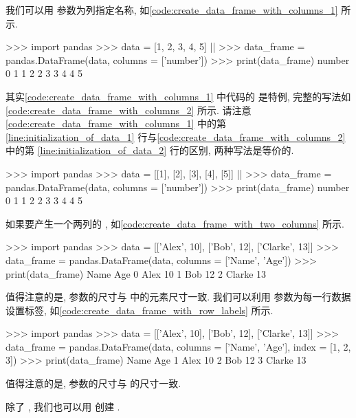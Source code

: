 我们可以用  参数为列指定名称, 如\cref{code:create_data_frame_with_columns_1} 所示.%
%
\begin{codebox}[
  label = code:create_data_frame_with_columns_1,
  caption = 用 \inlinetext{columns} 参数为列指定名称
]
>>> import pandas
>>> data = [1, 2, 3, 4, 5] |\label{line:initialization_of_data_1}|
>>> data_frame = pandas.DataFrame(data, columns = ['number'])
>>> print(data_frame)
   number
0       1
1       2
2       3
3       4
4       5
\end{codebox}%
%
其实\cref{code:create_data_frame_with_columns_1} 中代码的  是特例, 完整的写法如\cref{code:create_data_frame_with_columns_2} 所示. 请注意\cref{code:create_data_frame_with_columns_1} 中的第 \ref{line:initialization_of_data_1} 行与\cref{code:create_data_frame_with_columns_2} 中的第 \ref{line:initialization_of_data_2} 行的区别, 两种写法是等价的.%
%
\begin{codebox}[
  label = code:create_data_frame_with_columns_2,
  caption = 用 \inlinetext{columns} 参数为列指定名称,
]
>>> import pandas
>>> data = [[1], [2], [3], [4], [5]] |\label{line:initialization_of_data_2}|
>>> data_frame = pandas.DataFrame(data, columns = ['number'])
>>> print(data_frame)
   number
0       1
1       2
2       3
3       4
4       5
\end{codebox}

如果要产生一个两列的 , 如\cref{code:create_data_frame_with_two_columns} 所示.%
%
\begin{codebox}[
  label = code:create_data_frame_with_two_columns,
  caption = 产生两列的 \inlinetext{DataFrame},
]
>>> import pandas
>>> data = [['Alex', 10], ['Bob', 12], ['Clarke', 13]]
>>> data_frame = pandas.DataFrame(data, columns = ['Name', 'Age'])
>>> print(data_frame)
     Name  Age
0    Alex   10
1     Bob   12
2  Clarke   13
\end{codebox}%
%
值得注意的是,  参数的尺寸与  中的元素尺寸一致. 我们可以利用  参数为每一行数据设置标签, 如\cref{code:create_data_frame_with_row_labels} 所示.%
%
\begin{codebox}[
  label = code:create_data_frame_with_row_labels,
  caption = 为 \inlinetext{DataFrame} 设置行标签,
]
>>> import pandas
>>> data = [['Alex', 10], ['Bob', 12], ['Clarke', 13]]
>>> data_frame = pandas.DataFrame(data, columns = ['Name', 'Age'], index = [1, 2, 3])
>>> print(data_frame)
     Name  Age
1    Alex   10
2     Bob   12
3  Clarke   13
\end{codebox}%
%
值得注意的是,  参数的尺寸与  的尺寸一致.

除了 , 我们也可以用  创建 .

